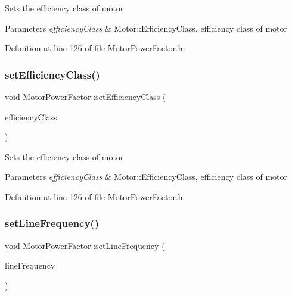 Sets the efficiency class of motor 
\begin{DoxyParams}{Parameters}
{\em efficiency\+Class} & Motor\+::\+Efficiency\+Class, efficiency class of motor \\
\hline
\end{DoxyParams}


Definition at line 126 of file Motor\+Power\+Factor.\+h.

\mbox{\label{class_motor_power_factor_add3125243d7f11131abc4e1d172ffdfc}} 
\subsubsection{\texorpdfstring{set\+Efficiency\+Class()}{setEfficiencyClass()}\hspace{0.1cm}{\footnotesize\ttfamily [3/3]}}
{\footnotesize\ttfamily void Motor\+Power\+Factor\+::set\+Efficiency\+Class (\begin{DoxyParamCaption}\item[{Motor\+::\+Efficiency\+Class}]{efficiency\+Class }\end{DoxyParamCaption})\hspace{0.3cm}{\ttfamily [inline]}}

Sets the efficiency class of motor 
\begin{DoxyParams}{Parameters}
{\em efficiency\+Class} & Motor\+::\+Efficiency\+Class, efficiency class of motor \\
\hline
\end{DoxyParams}


Definition at line 126 of file Motor\+Power\+Factor.\+h.

\mbox{\label{class_motor_power_factor_a5186ccae4191cfc5b2b7c3bdbd166563}} 
\subsubsection{\texorpdfstring{set\+Line\+Frequency()}{setLineFrequency()}\hspace{0.1cm}{\footnotesize\ttfamily [1/3]}}
{\footnotesize\ttfamily void Motor\+Power\+Factor\+::set\+Line\+Frequency (\begin{DoxyParamCaption}\item[{Motor\+::\+Line\+Frequency}]{line\+Frequency }\end{DoxyParamCaption})\hspace{0.3cm}{\ttfamily [inline]}}

